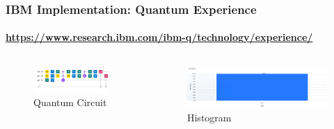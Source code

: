 \begin{frame}[fragile]{}
	\frametitle{IBM Implementation: Quantum Experience}
	\framesubtitle{\href{https://www.research.ibm.com/ibm-q/technology/experience/}{https://www.research.ibm.com/ibm-q/technology/experience/}}
	\begin{columns}
		\begin{column}{0.75\textwidth}
			\begin{figure}
				\includegraphics[trim=0 0 0 0,width=0.9\textwidth]{figures/ibm-implementation/circuit.png}
				\caption{Quantum Circuit}
			\end{figure}
		\end{column}
		\begin{column}{0.25\textwidth}  %
			\begin{figure}
				\includegraphics[width=\textwidth]{figures/ibm-implementation/histogram.png}
				\caption{Histogram}
			\end{figure}
		\end{column}
	\end{columns}
\end{frame}	